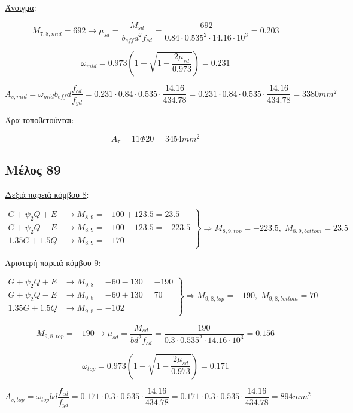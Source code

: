 \noindent
\underline{Άνοιγμα}:

\bigskip

\[
M_{7,8,mid} = 692 \rightarrow \mu_{sd} = \dfrac{M_{sd}}{b_{eff} d^2 f_{cd}} = \dfrac{692}{0.84\cdot0.535^2\cdot14.16\cdot10^3} = 0.203
\]

\[
\omega_{mid} = 0.973\left( 1 - \sqrt{1 - \dfrac{2\mu_{sd}}{0.973}} \right) = 0.231
\]

\[
A_{s,mid} = \omega_{mid}b_{eff} d \dfrac{f_{cd}}{f_{yd}} = 0.231\cdot 0.84 \cdot 0.535 \cdot \dfrac{14.16}{434.78} = 0.231\cdot 0.84 \cdot 0.535 \cdot \dfrac{14.16}{434.78} = 3380 mm^2
\]

\noindent
Άρα τοποθετούνται:

\[
A_{\tau} = 11\Phi20 = 3454 mm^2
\]

\subsection{Μέλος 89}

\noindent
\underline{Δεξιά παρειά κόμβου 8}:

\[
\left.
   \begin{array}{ll}
       G+\psi_2 Q + Ε & \rightarrow M_{8,9} = -100+123.5 = 23.5 \\
       G+\psi_2 Q - Ε & \rightarrow M_{8,9} = -100-123.5 = -223.5 \\
       1.35G + 1.5Q     & \rightarrow M_{8,9} = -170
   \end{array}
\right \} \Rightarrow M_{8,9,top} = -223.5,\; M_{8,9,bottom} = 23.5
\]

\noindent
\underline{Αριστερή παρειά κόμβου 9}:

\[
\left.
   \begin{array}{ll}
       G+\psi_2 Q + Ε & \rightarrow M_{9,8} = -60-130 = -190 \\
       G+\psi_2 Q - Ε & \rightarrow M_{9,8} = -60+130 = 70 \\
       1.35G + 1.5Q     & \rightarrow M_{9,8} = -102
   \end{array}
\right \} \Rightarrow M_{9,8,top} = -190,\; M_{9,8,bottom} = 70
\]

\[
M_{9,8,top} = -190 \rightarrow \mu_{sd} = \dfrac{M_{sd}}{b d^2 f_{cd}} = \dfrac{190}{0.3\cdot0.535^2\cdot14.16\cdot10^3} = 0.156
\]

\[
\omega_{top} = 0.973\left( 1 - \sqrt{1 - \dfrac{2\mu_{sd}}{0.973}} \right) = 0.171
\]

\[
A_{s,top} = \omega_{top}b d \dfrac{f_{cd}}{f_{yd}} = 0.171\cdot 0.3 \cdot 0.535 \cdot \dfrac{14.16}{434.78} = 0.171\cdot 0.3 \cdot 0.535 \cdot \dfrac{14.16}{434.78} = 894mm^2
\]

